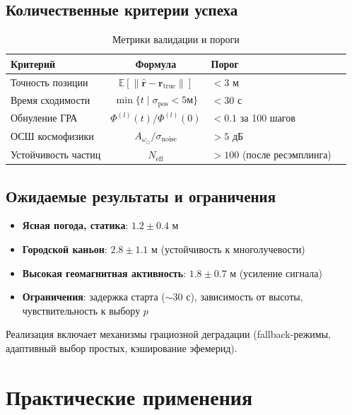 \documentclass[12pt,a4paper]{article}
\theoremstyle{plain}
\theoremstyle{definition}
\begin{document}
\subsection{Количественные критерии успеха}
\begin{table}[H]
\centering
\caption{Метрики валидации и пороги}
\label{tab:criteria}
\renewcommand{\arraystretch}{1.3}
\begin{tabular}{@{}lcp{5cm}c@{}}
\toprule
\textbf{Критерий} & \textbf{Формула} & \textbf{Порог} \\
\midrule
Точность позиции & $\mathbb{E}[\|\hat{\mathbf{r}} - \mathbf{r}_{\text{true}}\|]$ & $< 3$ м \\
\addlinespace
Время сходимости & $\min\{t \mid \sigma_{\text{pos}} < 5\text{м}\}$ & $< 30$ с \\
\addlinespace
Обнуление ГРА & $\Phi^{(l)}(t)/\Phi^{(l)}(0)$ & $< 0.1$ за 100 шагов \\
\addlinespace
ОСШ космофизики & $A_{\omega_\odot} / \sigma_{\text{noise}}$ & $> 5$ дБ \\
\addlinespace
Устойчивость частиц & $N_{\text{eff}}$ & $> 100$ (после ресэмплинга) \\
\bottomrule
\end{tabular}
\end{table}

\subsection{Ожидаемые результаты и ограничения}
\begin{itemize}
    \item \textbf{Ясная погода, статика}: $1.2 \pm 0.4$ м
    \item \textbf{Городской каньон}: $2.8 \pm 1.1$ м (устойчивость к многолучевости)
    \item \textbf{Высокая геомагнитная активность}: $1.8 \pm 0.7$ м (усиление сигнала)
    \item \textbf{Ограничения}: задержка старта ($\sim 30$ с), зависимость от высоты, чувствительность к выбору $p$
\end{itemize}
Реализация включает механизмы грациозной деградации (fallback-режимы, адаптивный выбор простых, кэширование эфемерид).

\section{Практические применения}
\label{sec:applications}
\end{document}
